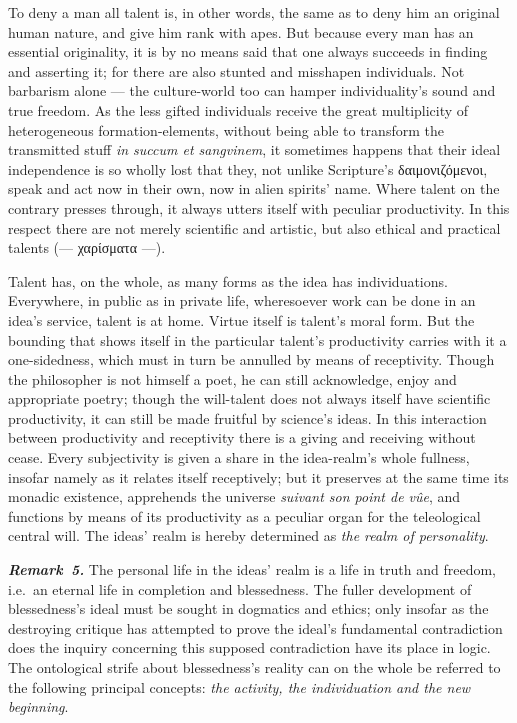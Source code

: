 \documentclass[12pt]{book}
\newcommand{\anm}[1]{\emph{\textbf{Remark~#1.}}}
\begin{document}
To deny a man all talent is, in other words, the same as to deny him an
original human nature, and give him rank with apes. But because every man
has an essential originality, it is by no means said that one always
succeeds in finding and asserting it; for there are also stunted and
misshapen individuals. Not barbarism alone --- the culture-world too can
hamper individuality's sound and true freedom. As the less gifted
individuals receive the great multiplicity of heterogeneous
formation-elements, without being able to transform the transmitted stuff
\textit{in succum et sangvinem}, it sometimes happens that their ideal
independence is so wholly lost that they, not unlike Scripture's
δαιμονιζόμενοι, speak and act now in their own, now in alien spirits' name.
Where talent on the contrary presses through, it always utters itself with
peculiar productivity. In this respect there are not merely scientific and
artistic, but also ethical and practical talents (--- χαρίσματα ---).

Talent has, on the whole, as many forms as the idea has individuations.
Everywhere, in public as in private life, wheresoever work can be done in an
idea's service, talent is at home. Virtue itself is talent's moral form. But
the bounding that shows itself in the particular talent's productivity
carries with it a one-sidedness, which must in turn be annulled by means of
receptivity. Though the philosopher is not himself a poet, he can still
acknowledge, enjoy and appropriate poetry; though the will-talent does not
always itself have scientific productivity, it can still be made fruitful by
science's ideas. In this interaction between productivity and receptivity
there is a giving and receiving without cease. Every subjectivity is given a
share in the idea-realm's whole fullness, insofar namely as it relates
itself receptively; but it preserves at the same time its monadic existence,
apprehends the universe \textit{suivant son point de vûe}, and functions by
means of its productivity as a peculiar organ for the teleological central
will. The ideas' realm is hereby determined as \emph{the realm of
personality}.

\anm{5} The personal life in the ideas' realm is a life in truth and
freedom, i.e.\ an eternal life in completion and blessedness. The fuller
development of blessedness's ideal must be sought in dogmatics and ethics;
only insofar as the destroying critique has attempted to prove the ideal's
fundamental contradiction does the inquiry concerning this supposed
contradiction have its place in logic. The ontological strife about
blessedness's reality can on the whole be referred to the following
principal concepts: \emph{the activity, the individuation and the new
beginning}.
\end{document}

